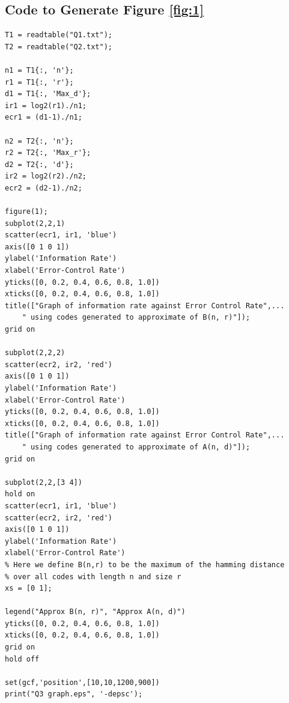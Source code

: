 \documentclass[11pt]{article} %
\begin{document}
\subsection*{Code to Generate Figure \ref{fig:1}}
\begin{lstlisting}
T1 = readtable("Q1.txt");
T2 = readtable("Q2.txt");

n1 = T1{:, 'n'};
r1 = T1{:, 'r'};
d1 = T1{:, 'Max_d'};
ir1 = log2(r1)./n1;
ecr1 = (d1-1)./n1;

n2 = T2{:, 'n'};
r2 = T2{:, 'Max_r'};
d2 = T2{:, 'd'};
ir2 = log2(r2)./n2;
ecr2 = (d2-1)./n2;

figure(1);
subplot(2,2,1)
scatter(ecr1, ir1, 'blue')
axis([0 1 0 1])
ylabel('Information Rate') 
xlabel('Error-Control Rate')
yticks([0, 0.2, 0.4, 0.6, 0.8, 1.0])
xticks([0, 0.2, 0.4, 0.6, 0.8, 1.0])
title(["Graph of information rate against Error Control Rate",...
    " using codes generated to approximate of B(n, r)"]);
grid on

subplot(2,2,2) 
scatter(ecr2, ir2, 'red')
axis([0 1 0 1])
ylabel('Information Rate') 
xlabel('Error-Control Rate')
yticks([0, 0.2, 0.4, 0.6, 0.8, 1.0])
xticks([0, 0.2, 0.4, 0.6, 0.8, 1.0])
title(["Graph of information rate against Error Control Rate",...
    " using codes generated to approximate of A(n, d)"]);
grid on

subplot(2,2,[3 4])
hold on
scatter(ecr1, ir1, 'blue')
scatter(ecr2, ir2, 'red')
axis([0 1 0 1])
ylabel('Information Rate') 
xlabel('Error-Control Rate')
% Here we define B(n,r) to be the maximum of the hamming distance
% over all codes with length n and size r
xs = [0 1];    

legend("Approx B(n, r)", "Approx A(n, d)")
yticks([0, 0.2, 0.4, 0.6, 0.8, 1.0])
xticks([0, 0.2, 0.4, 0.6, 0.8, 1.0])
grid on
hold off

set(gcf,'position',[10,10,1200,900])
print("Q3 graph.eps", '-depsc');
\end{lstlisting}
\end{document}
